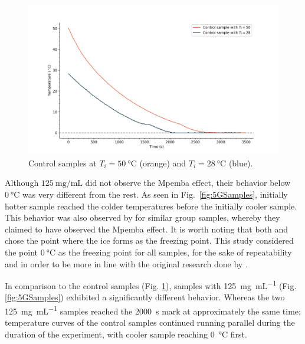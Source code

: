 \documentclass[../main.tex]{subfiles}
\begin{document}
\begin{figure}[H]
    \centering
    \includegraphics[scale=0.6]{figures/controlSamples.png}
    \caption{Control samples at $T_i = \SI{50}{\celsius}$ (orange) and $T_i = \SI{28}{\celsius}$ (blue).}
    \label{fig:controlSamples}
\end{figure}

Although $\SI{125}{\milli\gram\per\milli\liter}$ did not observe the Mpemba effect, their behavior below $\SI{0}{\celsius}$ was very different from the rest. As seen in Fig.~\ref{fig:5GSamples}, initially hotter sample reached the colder temperatures before the initially cooler sample. This behavior was also observed by \textcite{ibekwe_investigating_2016} for similar group samples, whereby they claimed to have observed the Mpemba effect. It is worth noting that both \textcite{ibekwe_investigating_2016} and \textcite{jeng_mpemba_2006} chose the point where the ice forms as the freezing point. This study considered the point $\SI{0}{\celsius}$ as the freezing point for all samples, for the sake of repeatability and in order to be more in line with the original research done by \textcite{mpemba_cool_1969}. \par

In comparison to the control samples (Fig. \ref{fig:controlSamples}), samples with \SI{125}{\milli\gram\per\milli\liter} (Fig. \ref{fig:5GSamples}) exhibited a significantly different behavior. Whereas the two \SI{125}{\milli\gram\per\milli\liter} samples reached the \SI{2000}{\second} mark at approximately the same time; temperature curves of the control samples continued running parallel during the duration of the experiment, with cooler sample reaching \SI{0}{\celsius} first. \par
\end{document}
